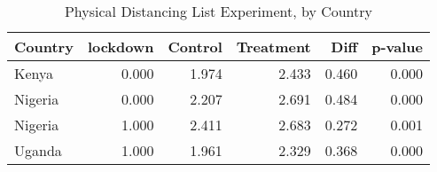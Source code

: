 \begin{table}[ht]
\centering
\caption{Physical Distancing List Experiment, by Country} 
\label{tab:list_lkd}
\begin{tabular}{lrrrrr}
  \hline
Country & lockdown & Control & Treatment & Diff & p-value \\ 
  \hline
Kenya & 0.000 & 1.974 & 2.433 & 0.460 & 0.000 \\ 
  Nigeria & 0.000 & 2.207 & 2.691 & 0.484 & 0.000 \\ 
  Nigeria & 1.000 & 2.411 & 2.683 & 0.272 & 0.001 \\ 
  Uganda & 1.000 & 1.961 & 2.329 & 0.368 & 0.000 \\ 
   \hline
\end{tabular}
\end{table}

